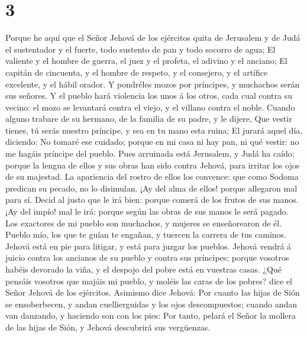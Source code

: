 \hypertarget{section-2}{%
\section{3}\label{section-2}}

 Porque he aquí que el Señor Jehová de los ejércitos quita
de Jerusalem y de Judá el sustentador y el fuerte, todo sustento de pan
y todo socorro de agua;  El valiente y el hombre de guerra,
el juez y el profeta, el adivino y el anciano;  El capitán
de cincuenta, y el hombre de respeto, y el consejero, y el artífice
excelente, y el hábil orador.  Y pondréles mozos por
príncipes, y muchachos serán sus señores.  Y el pueblo hará
violencia los unos á los otros, cada cual contra su vecino: el mozo se
levantará contra el viejo, y el villano contra el noble. 
Cuando alguno trabare de su hermano, de la familia de su padre, y le
dijere, Que vestir tienes, tú serás nuestro príncipe, y sea en tu mano
esta ruina;  El jurará aquel día, diciendo: No tomaré ese
cuidado; porque en mi casa ni hay pan, ni qué vestir: no me hagáis
príncipe del pueblo.  Pues arruinada está Jerusalem, y Judá
ha caído; porque la lengua de ellos y sus obras han sido contra Jehová,
para irritar los ojos de su majestad.  La apariencia del
rostro de ellos los convence: que como Sodoma predican su pecado, no lo
disimulan. ¡Ay del alma de ellos! porque allegaron mal para sí.
 Decid al justo que le irá bien: porque comerá de los
frutos de sus manos.  ¡Ay del impío! mal le irá: porque
según las obras de sus manos le será pagado.  Los exactores
de mi pueblo son muchachos, y mujeres se enseñorearon de él. Pueblo mío,
los que te guían te engañan, y tuercen la carrera de tus caminos.
 Jehová está en pie para litigar, y está para juzgar los
pueblos.  Jehová vendrá á juicio contra los ancianos de su
pueblo y contra sus príncipes; porque vosotros habéis devorado la viña,
y el despojo del pobre está en vuestras casas.  ¿Qué
pensáis vosotros que majáis mi pueblo, y moléis las caras de los pobres?
dice el Señor Jehová de los ejércitos.  Asimismo dice
Jehová: Por cuanto las hijas de Sión se ensoberbecen, y andan
cuellierguidas y los ojos descompuestos; cuando andan van danzando, y
haciendo son con los pies:  Por tanto, pelará el Señor la
mollera de las hijas de Sión, y Jehová descubrirá sus vergüenzas.


